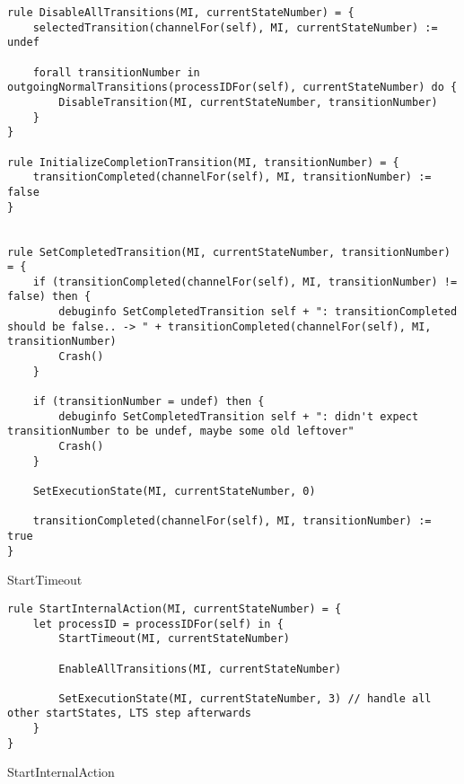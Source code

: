 \begin{listing}[H]
\begin{verbatim}
rule DisableAllTransitions(MI, currentStateNumber) = {
    selectedTransition(channelFor(self), MI, currentStateNumber) := undef

    forall transitionNumber in outgoingNormalTransitions(processIDFor(self), currentStateNumber) do {
        DisableTransition(MI, currentStateNumber, transitionNumber)
    }
}

rule InitializeCompletionTransition(MI, transitionNumber) = {
    transitionCompleted(channelFor(self), MI, transitionNumber) := false
}


rule SetCompletedTransition(MI, currentStateNumber, transitionNumber) = {
    if (transitionCompleted(channelFor(self), MI, transitionNumber) != false) then {
        debuginfo SetCompletedTransition self + ": transitionCompleted should be false.. -> " + transitionCompleted(channelFor(self), MI, transitionNumber)
        Crash()
    }

    if (transitionNumber = undef) then {
        debuginfo SetCompletedTransition self + ": didn't expect transitionNumber to be undef, maybe some old leftover"
        Crash()
    }

    SetExecutionState(MI, currentStateNumber, 0)

    transitionCompleted(channelFor(self), MI, transitionNumber) := true
}
\end{verbatim}
\caption{StartTimeout}
\label{lst:asm:StartTimeout}
\end{listing}





\begin{listing}[H]
\begin{verbatim}
rule StartInternalAction(MI, currentStateNumber) = {
    let processID = processIDFor(self) in {
        StartTimeout(MI, currentStateNumber)

        EnableAllTransitions(MI, currentStateNumber)

        SetExecutionState(MI, currentStateNumber, 3) // handle all other startStates, LTS step afterwards
    }
}
\end{verbatim}
\caption{StartInternalAction}
\label{lst:asm:StartInternalAction}
\end{listing}




